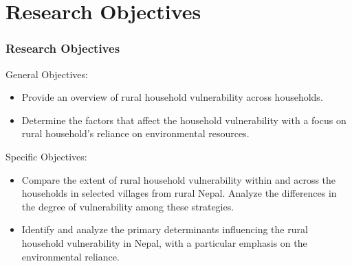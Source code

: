 \documentclass{beamer}
\begin{document}
	\section{Research Objectives}
	\begin{frame}[t]
		\frametitle{Research Objectives}             
		
		\begin{block}{General Objectives:}
			\begin{itemize}	
				\item \small Provide an overview of rural household 
				vulnerability across households.
				\item \small Determine the factors that affect the household vulnerability with a focus on rural household’s reliance on environmental resources.
			\end{itemize}
		\end{block} 
		\begin{exampleblock}{Specific Objectives:}
			\begin{itemize}	
				\item \small Compare the extent of rural household vulnerability within and across the households in selected villages from rural Nepal. Analyze the differences in the degree of vulnerability among these strategies.
				\item \small Identify and analyze the primary determinants 
				influencing the rural household vulnerability in Nepal, with a particular emphasis on the environmental reliance.
			\end{itemize}
		\end{exampleblock}
	\end{frame}
	
	
\end{document}
